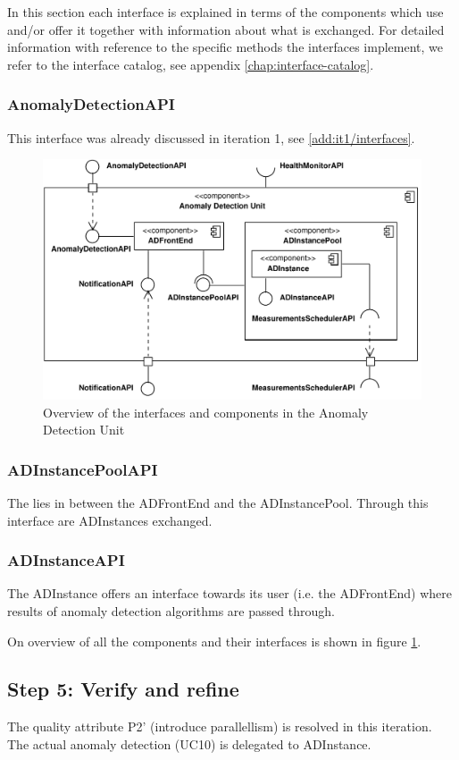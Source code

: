 \npar In this section each interface is explained in terms of the components
which use and/or offer it together with information about what is exchanged. For
detailed information with reference to the specific methods the interfaces
implement, we refer to the interface catalog, see appendix
\ref{chap:interface-catalog}.

\subsubsection{AnomalyDetectionAPI}

\npar This interface was already discussed in iteration 1, see
\ref{add:it1/interfaces}.

\begin{figure}[H]
	\begin{centering}
		\includegraphics[width=\textwidth]{figs/add-it6-interfaces.pdf}
		\caption{Overview of the interfaces and components in the Anomaly Detection
		Unit}
		\label{fig:it6/interfaces}
	\end{centering}
\end{figure}

\subsubsection{ADInstancePoolAPI}

\npar The  lies in between the ADFrontEnd and the
ADInstancePool. Through this interface are ADInstances exchanged.

\subsubsection{ADInstanceAPI}

\npar The ADInstance offers an interface towards its user (i.e. the ADFrontEnd)
where results of anomaly detection algorithms are passed through.

\npar On overview of all the components and their interfaces is shown in figure
\ref{fig:it6/interfaces}.


\subsection{Step 5: Verify and refine}
\label{add:it6/verification}

\npar The quality attribute P2' (introduce parallellism) is resolved in this
iteration. The actual anomaly detection (UC10) is delegated to ADInstance.
